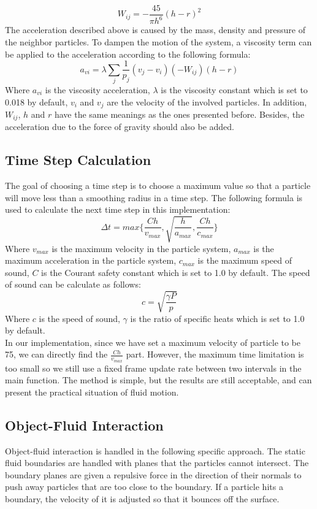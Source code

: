 \documentclass[acmtog]{acmart}
\begin{document}
\begin{equation*}
	W_{ij} = -\frac{45}{\pi h^6} (h-r)^2
\end{equation*}
The acceleration described above is caused by the mass, density and pressure of the neighbor particles. To dampen the motion of the system, a viscosity term can be applied to the acceleration according to the following formula:
\begin{equation*}
	a_{vi} = \lambda \sum_{j} \frac{1}{p_j} (v_j-v_i) (-W_{ij}) (h-r)
\end{equation*}
Where $a_{vi}$ is the viscosity acceleration, $\lambda$ is the viscosity constant which is set to 0.018 by default, $v_i$ and $v_j$ are the velocity of the involved particles. In addition, $W_{ij}$, $h$ and $r$ have the same meanings as the ones presented before. Besides, the acceleration due to the force of gravity should also be added.

\subsection{Time Step Calculation}
The goal of choosing a time step is to choose a maximum value so that a particle will move less than a smoothing radius in a time step. The following formula is used to calculate the next time step in this implementation:
\begin{equation*}
	\Delta t = max\{ \frac{Ch}{v_{max}}, \sqrt{\frac{h}{a_{max}}}, \frac{Ch}{c_{max}} \}
\end{equation*}
Where $v_{max}$ is the maximum velocity in the particle system, $a_{max}$ is the maximum acceleration in the particle system, $c_{max}$ is the maximum speed of sound, $C$ is the Courant safety constant which is set to 1.0 by default. The speed of sound can be calculate as follows:
\begin{equation*}
	c = \sqrt{\frac{\gamma P}{p}}
\end{equation*}
Where $c$ is the speed of sound, $\gamma$ is the ratio of specific heats which is set to 1.0 by default.\\
In our implementation, since we have set a maximum velocity of particle to be 75, we can directly find the $\frac{Ch}{v_{max}}$ part. However, the maximum time limitation is too small so we still use a fixed frame update rate between two intervals in the main function.
The method is simple, but the results are still acceptable, and can present the practical situation of fluid motion.

\subsection{Object-Fluid Interaction}
Object-fluid interaction is handled in the following specific approach. The static fluid boundaries are handled with planes that the particles cannot intersect. The boundary planes are given a repulsive force in the direction of their normals to push away particles that are too close to the boundary. If a particle hits a boundary, the velocity of it is adjusted so that it bounces off the surface.
\end{document}
